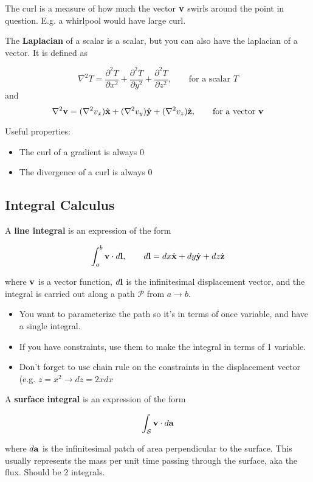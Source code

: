 \documentclass{article}
\newcommand{\vh}[1]{\hat{\vb{#1}}}
\begin{document}
The curl is a measure of how much the vector $\vb{v}$ swirls around the point in question. E.g. a whirlpool would have large curl.

The \textbf{Laplacian} of a scalar is a scalar, but you can also have the laplacian of a vector.  It is defined as 

$$
\nabla^2 T = \frac{\partial^2 T}{\partial x^2} + \frac{\partial^2 T}{\partial y^2} + \frac{\partial^2 T}{\partial z^2}, \qquad \text{for a scalar }T
$$
and 
$$
\nabla^2 \vb{v} = (\nabla^2 v_x)\vh{x} + (\nabla^2 v_y) \vh{y} + (\nabla^2 v_z) \vh{z}, \qquad \text{for a vector }\vb{v}
$$

Useful properties:
\begin{itemize}
    \item The curl of a gradient is always 0 
    \item The divergence of a curl is always 0
\end{itemize}


\subsection{Integral Calculus}

A \textbf{line integral} is an expression of the form

$$
\int_{a}^{b} \vb{v} \cdot d\vb{l}, \qquad d\vb{l} = dx \vh{x} + dy \vh{y} + dz \vh{z}
$$

where $\vb{v}$ is a vector function, $d\vb{l}$ is the infinitesimal displacement vector, and the integral is carried out along a path $\mathcal{P}$ from $a \to b$. 

\begin{itemize}
    \item You want to parameterize the path so it's in terms of once variable, and have a single integral.
    \item If you have constraints, use them to make the integral in terms of 1 variable.
    \item Don't forget to use chain rule on the constraints in the displacement vector (e.g. $z=x^2 \to dz = 2x dx$
\end{itemize}

A \textbf{surface integral} is an expression of the form

$$
\int_{\mathcal{S}} \vb{v} \cdot d\vb{a}
$$

where $d\vb{a}$ is the infinitesimal patch of area perpendicular to the surface.  This usually represents the mass per unit time passing through the surface, aka the flux.  Should be 2 integrals.
\end{document}
